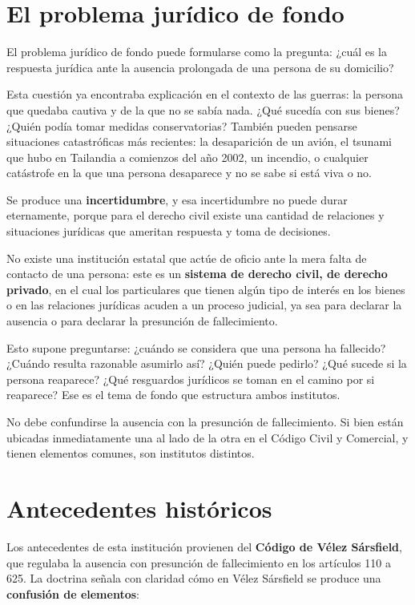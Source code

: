 \documentclass[12pt,oneside]{book}
\begin{document}
\section{El problema jurídico de fondo}

El problema jurídico de fondo puede formularse como la pregunta: ¿cuál es
la respuesta jurídica ante la ausencia prolongada de una persona de su
domicilio?

Esta cuestión ya encontraba explicación en el contexto de las guerras: la
persona que quedaba cautiva y de la que no se sabía nada. ¿Qué sucedía con
sus bienes? ¿Quién podía tomar medidas conservatorias? También pueden
pensarse situaciones catastróficas más recientes: la desaparición de un
avión, el tsunami que hubo en Tailandia a comienzos del año 2002, un
incendio, o cualquier catástrofe en la que una persona desaparece y no se
sabe si está viva o no.

Se produce una \textbf{incertidumbre}, y esa incertidumbre no puede durar
eternamente, porque para el derecho civil existe una cantidad de
relaciones y situaciones jurídicas que ameritan respuesta y toma de
decisiones.

No existe una institución estatal que actúe de oficio ante la mera falta
de contacto de una persona: este es un \textbf{sistema de derecho civil,
de derecho privado}, en el cual los particulares que tienen algún tipo de
interés en los bienes o en las relaciones jurídicas acuden a un proceso
judicial, ya sea para declarar la ausencia o para declarar la presunción
de fallecimiento.

Esto supone preguntarse: ¿cuándo se considera que una persona ha
fallecido? ¿Cuándo resulta razonable asumirlo así? ¿Quién puede pedirlo?
¿Qué sucede si la persona reaparece? ¿Qué resguardos jurídicos se toman en
el camino por si reaparece? Ese es el tema de fondo que estructura ambos
institutos.

\begin{important}
No debe confundirse la ausencia con la presunción de fallecimiento. Si
bien están ubicadas inmediatamente una al lado de la otra en el Código
Civil y Comercial, y tienen elementos comunes, son institutos distintos.
\end{important}

\section{Antecedentes históricos}

Los antecedentes de esta institución provienen del \textbf{Código de
Vélez Sársfield}, que regulaba la ausencia con presunción de fallecimiento
en los artículos 110 a 625. La doctrina señala con claridad cómo en Vélez
Sársfield se produce una \textbf{confusión de elementos}:
\end{document}
